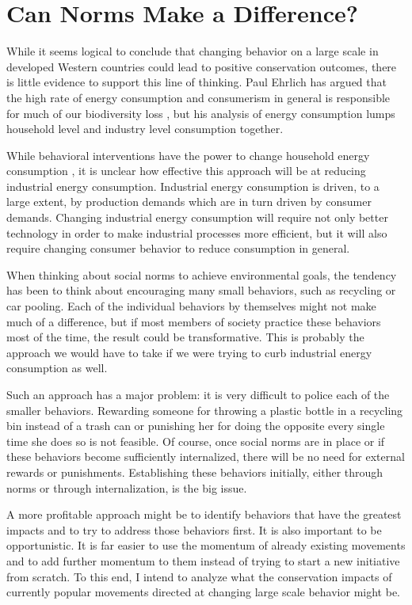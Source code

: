 \documentclass[rutwik_proposal.tex]{subfiles}
\begin{document}
\chapter{Can Norms Make a Difference?}\label{ch:usefulness}

While it seems logical to conclude that changing behavior on a large scale in developed Western countries could lead to positive conservation outcomes, there is little evidence to support this line of thinking. Paul Ehrlich has argued that the high rate of energy consumption and consumerism in general is responsible for much of our biodiversity loss \cite{Ehrlich94, Ehrlich71}, but his analysis of energy consumption lumps household level and industry level consumption together.

While behavioral interventions have the power to change household energy consumption \cite{Allcott11}, it is unclear how effective this approach will be at reducing industrial energy consumption. Industrial energy consumption is driven, to a large extent, by production demands which are in turn driven by consumer demands. Changing industrial energy consumption will require not only better technology in order to make industrial processes more efficient, but it will also require changing consumer behavior to reduce consumption in general.

When thinking about social norms to achieve environmental goals, the tendency has been to think about encouraging many small behaviors, such as recycling or car pooling. Each of the individual behaviors by themselves might not make much of a difference, but if most members of society practice these behaviors most of the time, the result could be transformative. This is probably the approach we would have to take if we were trying to curb industrial energy consumption as well.

Such an approach has a major problem: it is very difficult to police each of the smaller behaviors. Rewarding someone for throwing a plastic bottle in a recycling bin instead of a trash can or punishing her for doing the opposite every single time she does so is not feasible. Of course, once social norms are in place or if these behaviors become sufficiently internalized, there will be no need for external rewards or punishments. Establishing these behaviors initially, either through norms or through internalization, is the big issue.

A more profitable approach might be to identify behaviors that have the greatest impacts and to try to address those behaviors first. It is also important to be opportunistic. It is far easier to use the momentum of already existing movements and to add further momentum to them instead of trying to start a new initiative from scratch. To this end, I intend to analyze what the conservation impacts of currently popular movements directed at changing large scale behavior might be.
\end{document}
